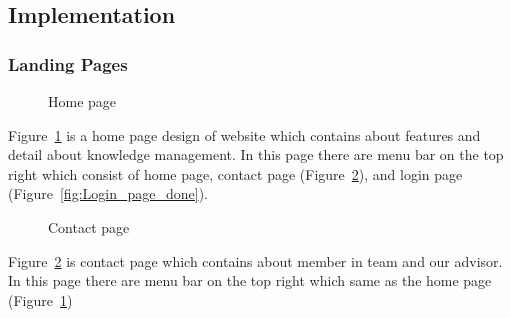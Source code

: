 \documentclass[12pt,oneside,openright,a4paper]{cpe-english-project}
\begin{document}
	\subsection{Implementation}
	\subsubsection{Landing Pages}
	\begin{figure}[!h]\centering
		\caption{Home page}\label{fig:Home_page_done}
	\end{figure}
	\begin{flushleft}
		Figure~\ref*{fig:Home_page_done} is a home page design of website which contains about features and detail about knowledge management. In this page there are menu bar on the top right which consist of home page, contact page (Figure~\ref*{fig:Contact_page_done}), and login page (Figure~\ref*{fig:Login_page_done}).
	\end{flushleft}

	\begin{figure}[!h]\centering
		\caption{Contact page}\label{fig:Contact_page_done}
	\end{figure}
	\begin{flushleft}
		Figure~\ref*{fig:Contact_page_done} is contact page which contains about member in team and our advisor. In this page there are menu bar on the top right which same as the home page (Figure~\ref*{fig:Home_page_done})
	\end{flushleft}
\end{document}
